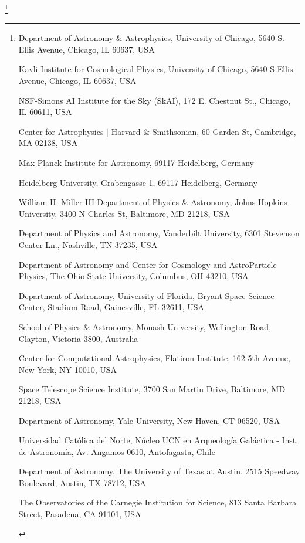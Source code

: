 \documentclass{natureprintstyle}
\begin{document}
\let\thefootnote\relax\footnote{

\begin{affiliations}
\item Department of Astronomy \& Astrophysics, University of Chicago, 5640 S. Ellis Avenue, Chicago, IL 60637, USA
\item Kavli Institute for Cosmological Physics, University of Chicago, 5640 S Ellis Avenue, Chicago, IL 60637, USA
\item NSF-Simons AI Institute for the Sky (SkAI), 172 E. Chestnut St., Chicago, IL 60611, USA
\item Center for Astrophysics $|$ Harvard \& Smithsonian, 60 Garden St, Cambridge, MA 02138, USA
\item Max Planck Institute for Astronomy, 69117 Heidelberg, Germany
\item Heidelberg University, Grabengasse 1, 69117 Heidelberg, Germany
\item William H. Miller III Department of Physics \& Astronomy, Johns Hopkins University, 3400 N Charles St, Baltimore, MD 21218, USA
\item Department of Physics and Astronomy, Vanderbilt University, 6301 Stevenson Center Ln., Nashville, TN 37235, USA
\item Department of Astronomy and Center for Cosmology and AstroParticle Physics, The Ohio State University, Columbus, OH 43210, USA
\item Department of Astronomy, University of Florida, Bryant Space Science Center, Stadium Road, Gainesville, FL 32611, USA
\item School of Physics \& Astronomy, Monash University, Wellington Road, Clayton, Victoria 3800, Australia
\item Center for Computational Astrophysics, Flatiron Institute, 162 5th Avenue, New York, NY 10010, USA
\item Space Telescope Science Institute, 3700 San Martin Drive, Baltimore, MD 21218, USA
\item Department of Astronomy, Yale University, New Haven, CT 06520, USA
\item Universidad Cat\'olica del Norte, N\'ucleo UCN en Arqueolog\'ia Gal\'actica - Inst. de Astronom\'ia, Av. Angamos 0610, Antofagasta, Chile
\item Department of Astronomy, The University of Texas at Austin, 2515 Speedway Boulevard, Austin, TX 78712, USA
\item The Observatories of the Carnegie Institution for Science, 813 Santa Barbara Street, Pasadena, CA 91101, USA

\end{affiliations}}
\end{document}
